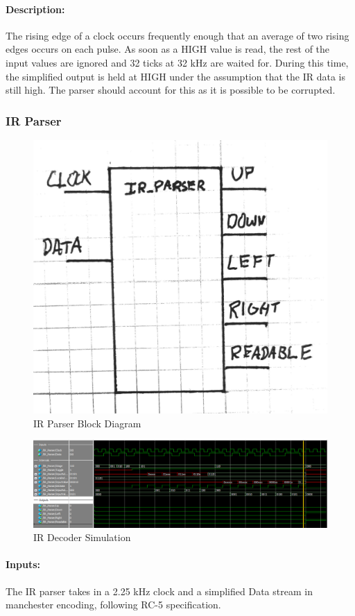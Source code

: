 \documentclass[]{article}
\begin{document}
\paragraph{Description:} The rising edge of a clock occurs frequently enough that an average of two rising edges occurs on each pulse.
As soon as a HIGH value is read, the rest of the input values are ignored and 32 ticks at 32 kHz are waited for.
During this time, the simplified output is held at HIGH under the assumption that the IR data is still high.
The parser should account for this as it is possible to be corrupted.

\subsubsection{IR Parser}
\label{irparser}
\begin{figure}[H]\centering
    \includegraphics[width=0.5\linewidth]{figures/IR_Parser_Block.jpg}
    \caption{IR Parser Block Diagram}
    \label{fig:irParserBlock}
\end{figure}
\begin{figure}[H]\centering
    \includegraphics[width=\linewidth]{figures/IR_Parser_Sim.png}
    \caption{IR Decoder Simulation}
    \label{fig:irParserSim}
\end{figure}
\paragraph{Inputs:} The IR parser takes in a 2.25 kHz clock and a simplified Data stream in manchester encoding, following RC-5 specification.
\end{document}
